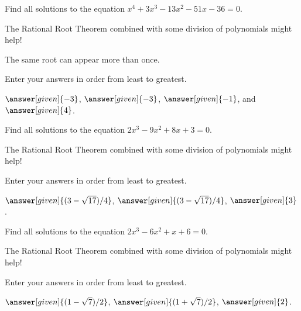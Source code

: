 \documentclass[nooutcomes]{ximera}
\begin{document}

\begin{problem}
Find all solutions to the equation $x^4+3x^3-13x^2-51x-36=0$. 
\begin{hint} 
The Rational Root Theorem combined with some division of polynomials might help!
\end{hint}
\begin{hint}
The same root can appear more than once.  
\end{hint}
Enter your answers in order from least to greatest.
\begin{prompt}
$\answer[given]{-3}$, $\answer[given]{-3}$, $\answer[given]{-1}$, and $\answer[given]{4}$. 
\end{prompt}
\end{problem}

\begin{problem}
Find all solutions to the equation $2x^3-9x^2+8x+3=0$. 
\begin{hint} 
The Rational Root Theorem combined with some division of polynomials might help!
\end{hint}
Enter your answers in order from least to greatest.
\begin{prompt}
$\answer[given]{(3-\sqrt{17})/4}$, $\answer[given]{(3-\sqrt{17})/4}$, $\answer[given]{3}$.
\end{prompt}
\end{problem}


\begin{problem}
Find all solutions to the equation $2x^3-6x^2+x+6=0$. 
\begin{hint} 
The Rational Root Theorem combined with some division of polynomials might help!
\end{hint}
Enter your answers in order from least to greatest.
\begin{prompt}
$\answer[given]{(1-\sqrt{7})/2}$, $\answer[given]{(1+\sqrt{7})/2}$, $\answer[given]{2}$.
\end{prompt}
\end{problem}
\end{document}
